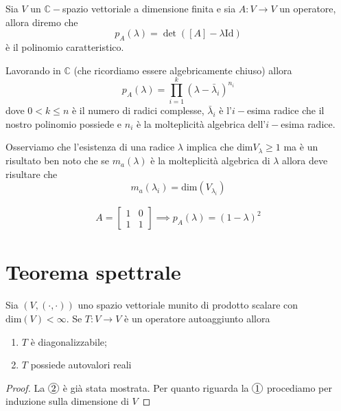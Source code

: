 \documentclass[12pt, twoside, italian, openany]{book}
\begin{document}
	\begin{definition}
		Sia $V$ un $\mathbb{C}-$spazio vettoriale a dimensione finita e sia $A: V \to V$ un operatore, allora diremo che
		$$
		p_A(\lambda) = \det{([A] - \lambda \text{Id})}
		$$
		è il polinomio caratteristico.
	\end{definition}
	\begin{remark}
		Lavorando in $\mathbb{C}$ (che ricordiamo essere algebricamente chiuso) allora
		$$
		p_A(\lambda) = \prod_{i=1}^k (\lambda - \bar{\lambda}_{i})^{n_i}
		$$
		dove $0 < k \leq n$ è il numero di radici complesse, $\bar{\lambda}_i$ è l'$i-$esima radice che il nostro polinomio possiede e $n_i$ è la molteplicità algebrica dell'$i-$esima radice.
	\end{remark}
	Osserviamo che l'esistenza di una radice $\lambda$ implica che $\text{dim}V_\lambda \geq 1$ ma è un risultato ben noto che se $m_a(\lambda)$ è la molteplicità algebrica di $\lambda$ allora deve risultare che
	$$
	m_a(\lambda_i) = \text{dim}(V_{\lambda_i})
	$$
	\begin{example}
		\begin{align*}		
			A = \begin{bmatrix}
				1 & 0 \\
				1 & 1
			\end{bmatrix} \implies p_A(\lambda) = (1 - \lambda)^2
		\end{align*}
	\end{example}
	\section{Teorema spettrale}
	\begin{theorem}
		Sia $(V, (\cdot, \cdot))$ uno spazio vettoriale munito di prodotto scalare con $\text{dim}(V) < \infty$. Se $T: V \to V$ è un operatore autoaggiunto allora
		\begin{enumerate}[label=\protect\circled{\arabic*}]
			\item $T$ è diagonalizzabile;
			\item $T$ possiede autovalori reali
		\end{enumerate}
	\end{theorem}
	\begin{proof}
		La $\circled{2}$ è già stata mostrata. Per quanto riguarda la $\circled{1}$ procediamo per induzione sulla dimensione di $V$
	\end{proof}


\end{document}
